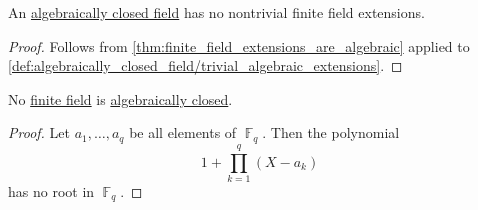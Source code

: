 \begin{proposition}\label{thm:no_finite_extensions_of_closed_fields}
  An \hyperref[def:algebraically_closed_field]{algebraically closed field} has no nontrivial finite field extensions.
\end{proposition}
\begin{proof}
  Follows from \cref{thm:finite_field_extensions_are_algebraic} applied to \cref{def:algebraically_closed_field/trivial_algebraic_extensions}.
\end{proof}

\begin{proposition}\label{thm:no_finite_field_is_algebraically_closed}
  No \hyperref[def:finite_field]{finite field} is \hyperref[def:algebraically_closed_field]{algebraically closed}.
\end{proposition}
\begin{proof}
  Let \( a_1, \ldots, a_q \) be all elements of \( \BbbF_q \). Then the polynomial
  \begin{equation*}
    1 + \prod_{k=1}^q (X - a_k)
  \end{equation*}
  has no root in \( \BbbF_q \).
\end{proof}
